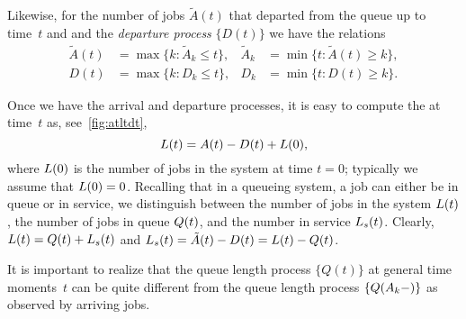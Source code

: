 \documentclass[stochastic-or.tex]{subfiles}
\begin{document}
Likewise, for the number of jobs $\tilde A(t)$ that departed from the queue up to time~$t$ and and the \emph{departure process} $\{D(t)\}$ we have the relations
\begin{align*}
\tilde A(t) &= \max\{k : \tilde A_k \leq t\}, &  \tilde A_{k} &=\min\{t: \tilde A(t) \geq k\}, \\
 D(t) &= \max\{k : D_k \leq t\}, &  D_{k} &=\min\{t: D(t) \geq k\}.
\end{align*}

Once we have the arrival and departure processes, it is easy to compute the  at time~$t$ as, see~\cref{fig:atltdt},
\begin{equation}\label{eq:14}
 L(t) = A(t) - D(t) + L(0),
\end{equation}
where $L(0)$ is the number of jobs in the system at time $t=0$; typically we assume that $L(0)=0$.
Recalling that in a queueing system, a job can either be in queue or in service, we distinguish between the number of jobs in the system $L(t)$, the number of jobs in queue $Q(t)$, and the number in service $L_s(t)$.
Clearly, $L(t) = Q(t) + L_s(t)$ and  $L_s(t) = \tilde A(t) - D(t) = L(t) - Q(t)$.

It is important to realize that the queue length process $\{Q(t)\}$ at general time moments~$t$ can be quite different from the queue length process $\{ Q(A_k-)\}$ as observed by arriving jobs.
\end{document}
